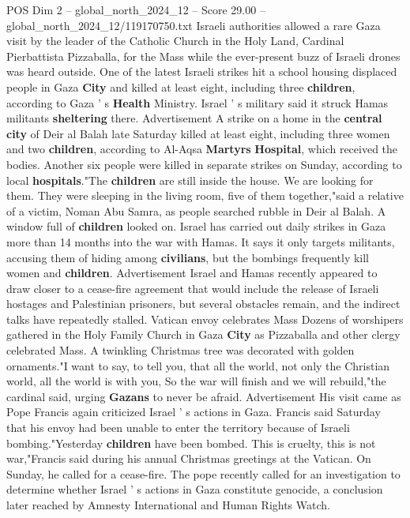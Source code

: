 \begin{textsample}{POS Dim 2 – global\_north\_2024\_12 – Score 29.00 – global\_north\_2024\_12/119170750.txt}  \label{ex:f2_pos_190}
Israeli authorities allowed a rare Gaza visit by the leader of the Catholic Church in the Holy Land, Cardinal Pierbattista Pizzaballa, for the Mass while the ever-present buzz of Israeli drones was heard outside.
One of the latest Israeli strikes hit a school housing displaced people in Gaza \textbf{City} and killed at least eight, including three \textbf{children}, according to Gaza ' s \textbf{Health} Ministry.
Israel ' s military said it struck Hamas militants \textbf{sheltering} there.
Advertisement A strike on a home in the \textbf{central} \textbf{city} of Deir al Balah late Saturday killed at least eight, including three women and two \textbf{children}, according to Al-Aqsa \textbf{Martyrs} \textbf{Hospital}, which received the bodies.
Another six people were killed in separate strikes on Sunday, according to local \textbf{hospitals}."The \textbf{children} are still inside the house.
We are looking for them.
They were sleeping in the living room, five of them together,"said a relative of a victim, Noman Abu Samra, as people searched rubble in Deir al Balah.
A window full of \textbf{children} looked on.
Israel has carried out daily strikes in Gaza more than 14 months into the war with Hamas.
It says it only targets militants, accusing them of hiding among \textbf{civilians}, but the bombings frequently kill women and \textbf{children}.
Advertisement Israel and Hamas recently appeared to draw closer to a cease-fire agreement that would include the release of Israeli hostages and Palestinian prisoners, but several obstacles remain, and the indirect talks have repeatedly stalled.
Vatican envoy celebrates Mass Dozens of worshipers gathered in the Holy Family Church in Gaza \textbf{City} as Pizzaballa and other clergy celebrated Mass.
A twinkling Christmas tree was decorated with golden ornaments."I want to say, to tell you, that all the world, not only the Christian world, all the world is with you, So the war will finish and we will rebuild,"the cardinal said, urging \textbf{Gazans} to never be afraid.
Advertisement His visit came as Pope Francis again criticized Israel ' s actions in Gaza.
Francis said Saturday that his envoy had been unable to enter the territory because of Israeli bombing."Yesterday \textbf{children} have been bombed.
This is cruelty, this is not war,"Francis said during his annual Christmas greetings at the Vatican.
On Sunday, he called for a cease-fire.
The pope recently called for an investigation to determine whether Israel ' s actions in Gaza constitute genocide, a conclusion later reached by Amnesty International and Human Rights Watch.

\end{textsample}
